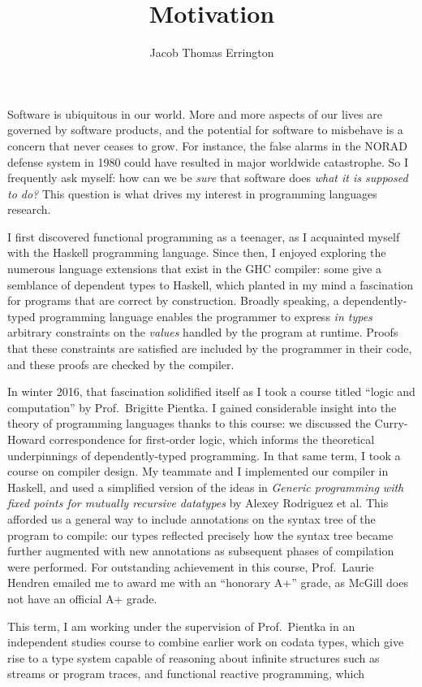 \documentclass[11pt,letterpaper]{article}
\author{Jacob Thomas Errington}
\title{Motivation}
\date{}
\begin{document}
\maketitle

Software is ubiquitous in our world. More and more aspects of our lives are
governed by software products, and the potential for software to misbehave is a
concern that never ceases to grow.
For instance, the false alarms in the NORAD defense system in 1980 could have
resulted in major worldwide catastrophe.
So I frequently ask myself: how can we be \emph{sure} that software does
\emph{what it is supposed to do?}
This question is what drives my interest in programming languages research.

I first discovered functional programming as a teenager, as I acquainted myself
with the Haskell programming language.
Since then, I enjoyed exploring the numerous language extensions that exist in
the GHC compiler:
some give a semblance of dependent types to Haskell, which planted in
my mind a fascination for programs that are correct by construction.
Broadly speaking, a dependently-typed programming language enables the
programmer to express \emph{in types} arbitrary constraints on the
\emph{values} handled by the program at runtime.
Proofs that these constraints are satisfied are included by the programmer
in their code, and these proofs are checked by the compiler.

In winter 2016, that fascination solidified itself as I took a course titled
``logic and computation'' by Prof.~Brigitte Pientka.
I gained considerable insight into the theory of programming languages thanks
to this course: we discussed the Curry-Howard correspondence for first-order
logic, which informs the theoretical underpinnings of dependently-typed
programming.
%
In that same term, I took a course on compiler design. My teammate and I
implemented our compiler in Haskell, and used a simplified version of the ideas
in \textit{Generic programming with fixed points for mutually recursive
datatypes} by Alexey Rodriguez et al.
This afforded us a general way to include annotations on the syntax tree of the
program to compile: our types reflected precisely how the syntax tree became
further augmented with new annotations as subsequent phases of compilation were
performed.
%
For outstanding achievement in this course, Prof.~Laurie Hendren emailed me to
award me with an ``honorary A+'' grade, as McGill does not have an official A+
grade.

This term, I am working under the supervision of Prof.~Pientka in an
independent studies course to combine earlier work on codata types, which give
rise to a type system capable of reasoning about infinite structures such as
streams or program traces, and functional reactive programming, which 
\end{document}
